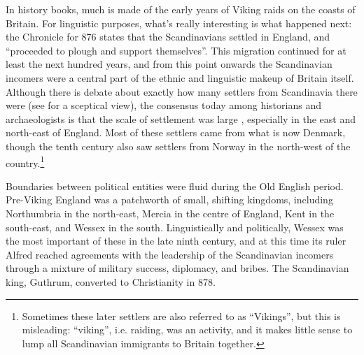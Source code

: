 In history books, much is made of the early years of Viking raids on the coasts of Britain. For linguistic purposes, what's really interesting is what happened next: the Chronicle for 876 states that the Scandinavians settled in England, and ``proceeded to plough and support themselves''. This migration continued for at least the next hundred years, and from this point onwards the Scandinavian incomers were a central part of the ethnic and linguistic makeup of Britain itself. Although there is debate about exactly how many settlers from Scandinavia there were (see \citealp{Sawyer1971} for a sceptical view), the consensus today among historians and archaeologists is that the scale of settlement was large \citep{Hadley1997,Hadley2009,KershawRoeyrvik2016}, especially in the east and north-east of England. Most of these settlers came from what is now Denmark, though the tenth century also saw settlers from Norway in the north-west of the country.\footnote{Sometimes these later settlers are also referred to as ``Vikings'', but this is misleading: ``viking'', i.e. raiding, was an activity, and it makes little sense to lump all Scandinavian immigrants to Britain together.}

Boundaries between political entities were fluid during the Old English period. Pre-Viking England was a patchworth of small, shifting kingdoms, including Northumbria in the north-east, Mercia in the centre of England, Kent in the south-east, and Wessex in the south. Linguistically and politically, Wessex was the most important of these in the late ninth century, and at this time its ruler Alfred reached agreements with the leadership of the Scandinavian incomers through a mixture of military success, diplomacy, and bribes. The Scandinavian king, Guthrum, converted to Christianity in 878.

